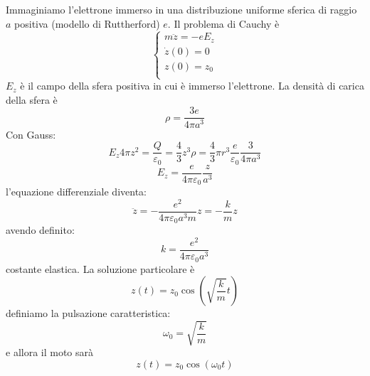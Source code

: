 Immaginiamo l'elettrone immerso in una distribuzione uniforme sferica di raggio $a$ positiva (modello di Ruttherford) $e$. Il problema di Cauchy è
\begin{equation}
  \left\{
  \begin{array}{l}
    m\ddot z=-eE_z \\
    \dot z(0)=0    \\
    z(0)=z_0       \\
  \end{array}
  \right.
\end{equation}
$E_z$ è il campo della sfera positiva in cui è immerso l'elettrone. La densità di carica della sfera è
\[
  \rho = \frac{3e}{4\pi a^3}
\]
Con Gauss:
\[
  E_z 4\pi z^2=\frac{Q}{\varepsilon_0}=\frac{4}{3}z^3\rho=\frac{4}{3}\pi r^3 \frac{e}{\varepsilon_0}\frac{3}{4\pi a^3}
\]
\begin{equation}
  E_z=\frac{e}{4\pi\varepsilon_0}\frac{z}{a^3}
\end{equation}
l'equazione differenziale diventa:
\[
  \ddot z=-\frac{e^2}{4\pi\varepsilon_0 a^3 m}z = -\frac{k}{m}z
\]
avendo definito:
\begin{equation}
  k = \frac{e^2}{4\pi\varepsilon_0 a^3}
\end{equation}
costante elastica. La soluzione particolare è
\[
  z(t)=z_0\cos\left(\sqrt{\frac{k}{m}}t\right)
\]
definiamo la pulsazione caratteristica:
\begin{equation}
  \omega_0 = \sqrt{\frac{k}{m}}
\end{equation}
e allora il moto sarà
\begin{equation}
  z(t)=z_0\cos\left(\omega_0 t\right)
\end{equation}
